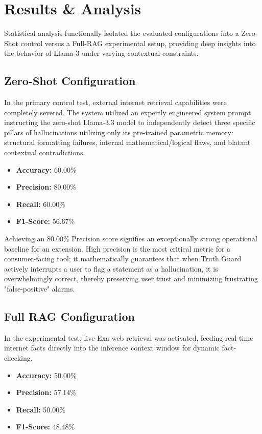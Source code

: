 \documentclass[conference]{IEEEtran}
\begin{document}
\section{Results \& Analysis}
Statistical analysis functionally isolated the evaluated configurations into a Zero-Shot control versus a Full-RAG experimental setup, providing deep insights into the behavior of Llama-3 under varying contextual constraints.

\subsection{Zero-Shot Configuration}
In the primary control test, external internet retrieval capabilities were completely severed. The system utilized an expertly engineered system prompt instructing the zero-shot Llama-3.3 model to independently detect three specific pillars of hallucinations utilizing only its pre-trained parametric memory: structural formatting failures, internal mathematical/logical flaws, and blatant contextual contradictions.

\begin{itemize}
    \item \textbf{Accuracy:} 60.00\%
    \item \textbf{Precision:} 80.00\%
    \item \textbf{Recall:} 60.00\%
    \item \textbf{F1-Score:} 56.67\%
\end{itemize}

Achieving an 80.00\% Precision score signifies an exceptionally strong operational baseline for an extension. High precision is the most critical metric for a consumer-facing tool; it mathematically guarantees that when Truth Guard actively interrupts a user to flag a statement as a hallucination, it is overwhelmingly correct, thereby preserving user trust and minimizing frustrating "false-positive" alarms.

\subsection{Full RAG Configuration}
In the experimental test, live Exa web retrieval was activated, feeding real-time internet facts directly into the inference context window for dynamic fact-checking.

\begin{itemize}
    \item \textbf{Accuracy:} 50.00\%
    \item \textbf{Precision:} 57.14\%
    \item \textbf{Recall:} 50.00\%
    \item \textbf{F1-Score:} 48.48\%
\end{itemize}
\end{document}
